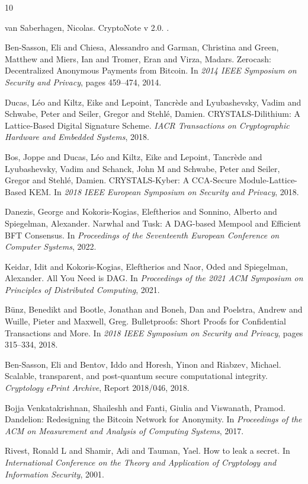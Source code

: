 \documentclass[12pt,a4paper]{article}
\begin{document}

\begin{thebibliography}{10}

van Saberhagen, Nicolas.
\newblock CryptoNote v 2.0.
.

Ben-Sasson, Eli and Chiesa, Alessandro and Garman, Christina and Green, Matthew and Miers, Ian and Tromer, Eran and Virza, Madars.
\newblock Zerocash: Decentralized Anonymous Payments from Bitcoin.
\newblock In \emph{2014 IEEE Symposium on Security and Privacy}, pages 459--474, 2014.

Ducas, Léo and Kiltz, Eike and Lepoint, Tancrède and Lyubashevsky, Vadim and Schwabe, Peter and Seiler, Gregor and Stehlé, Damien.
\newblock CRYSTALS-Dilithium: A Lattice-Based Digital Signature Scheme.
\newblock \emph{IACR Transactions on Cryptographic Hardware and Embedded Systems}, 2018.

Bos, Joppe and Ducas, Léo and Kiltz, Eike and Lepoint, Tancrède and Lyubashevsky, Vadim and Schanck, John M and Schwabe, Peter and Seiler, Gregor and Stehlé, Damien.
\newblock CRYSTALS-Kyber: A CCA-Secure Module-Lattice-Based KEM.
\newblock In \emph{2018 IEEE European Symposium on Security and Privacy}, 2018.

Danezis, George and Kokoris-Kogias, Eleftherios and Sonnino, Alberto and Spiegelman, Alexander.
\newblock Narwhal and Tusk: A DAG-based Mempool and Efficient BFT Consensus.
\newblock In \emph{Proceedings of the Seventeenth European Conference on Computer Systems}, 2022.

Keidar, Idit and Kokoris-Kogias, Eleftherios and Naor, Oded and Spiegelman, Alexander.
\newblock All You Need is DAG.
\newblock In \emph{Proceedings of the 2021 ACM Symposium on Principles of Distributed Computing}, 2021.

Bünz, Benedikt and Bootle, Jonathan and Boneh, Dan and Poelstra, Andrew and Wuille, Pieter and Maxwell, Greg.
\newblock Bulletproofs: Short Proofs for Confidential Transactions and More.
\newblock In \emph{2018 IEEE Symposium on Security and Privacy}, pages 315--334, 2018.

Ben-Sasson, Eli and Bentov, Iddo and Horesh, Yinon and Riabzev, Michael.
\newblock Scalable, transparent, and post-quantum secure computational integrity.
\newblock \emph{Cryptology ePrint Archive}, Report 2018/046, 2018.

Bojja Venkatakrishnan, Shaileshh and Fanti, Giulia and Viswanath, Pramod.
\newblock Dandelion: Redesigning the Bitcoin Network for Anonymity.
\newblock In \emph{Proceedings of the ACM on Measurement and Analysis of Computing Systems}, 2017.

Rivest, Ronald L and Shamir, Adi and Tauman, Yael.
\newblock How to leak a secret.
\newblock In \emph{International Conference on the Theory and Application of Cryptology and Information Security}, 2001.

\end{thebibliography}
\end{document}
